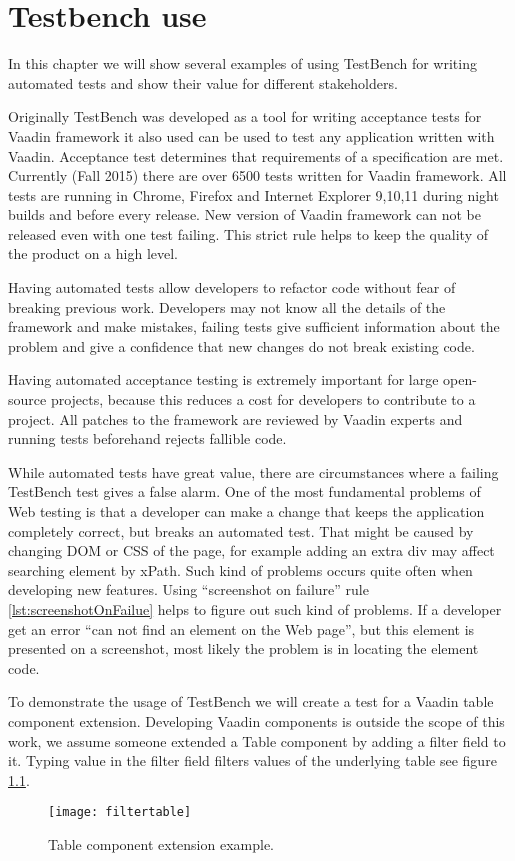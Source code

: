 \chapter{Testbench use}
\label{ch:testbenchuse}
In this chapter we will show several examples of using TestBench for writing
automated tests and show their value for different stakeholders. 

Originally TestBench was developed as a tool for writing acceptance tests for 
Vaadin framework it also used can be used to test any application written with
Vaadin. Acceptance test determines that requirements of a specification are met.
Currently (Fall 2015) there are over 6500 tests written for Vaadin framework.
All tests are running in Chrome, Firefox and Internet Explorer 9,10,11 during
night builds and before every release. New version of Vaadin framework can
not be released even with one test failing. This strict rule helps to keep
the quality of the product on a high level.

Having automated tests allow developers to refactor code without fear of
breaking previous work. Developers may not know all the details of the framework and make mistakes,
 failing tests give sufficient information about the problem 
 and give a confidence that new changes do not break existing code.
   
 Having automated acceptance testing is extremely important for large
 open-source projects, because this reduces a cost for developers to contribute
 to a project.  All patches to the framework are reviewed by Vaadin experts and
 running tests beforehand rejects fallible code.

 While automated tests have great value, there are circumstances
 where a failing TestBench test gives a false alarm. One of the most fundamental
  problems of Web testing is that a developer can make a change that keeps
   the application completely correct, but breaks an automated test.   
That might be caused by changing DOM or CSS of the page, for example adding
an extra div may affect searching element by xPath. Such kind of problems 
occurs quite often when developing new features. Using ``screenshot on failure''
rule \ref{lst:screenshotOnFailue} helps to figure out such kind of problems. If
a developer get an error ``can not find an element on the Web page'', 
but this element is presented on a screenshot, most likely the problem is in
locating the element code.

To demonstrate the usage of TestBench we will create a test for a Vaadin table
component extension. Developing Vaadin components is outside the scope of
this work, we assume someone extended a Table component by adding a filter field to
it. Typing value in the filter field filters values of the underlying table see
figure \ref{fig:filtertable}.
	\begin{figure}
	\centering
	\texttt{[image: filtertable]}
	\caption{Table component extension example.}
	\label{fig:filtertable}
	\end{figure}

